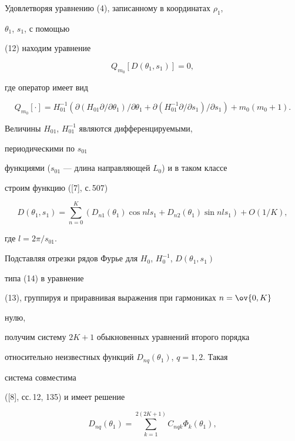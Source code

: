 Удовлетворяя уравнению (4), записанному в координатах $\rho_1$, 


$\theta_1$, $s_1$, с помощью  


(12) находим уравнение 


\begin{equation} 


Q_{m_0}[D(\theta_1,s_1)]=0, 


\end{equation} 


где оператор имеет вид 


$$ 


Q_{m_0}[\cdot]=H^{-1}_{01}(\partial(H_{01}\partial/ 


\partial\theta_1)/\partial\theta_1+\partial(H^{-1}_{01}\partial/ 


\partial s_1)/\partial s_1)+m_0(m_0+1). 


$$ 


Величины $H_{01}$, $H^{-1}_{01}$ являются дифференцируемыми, 


периодическими по $s_{01}$ 


функциями ($s_{01}$ --- длина направляющей $L_0$) и в таком классе 


строим функцию ([7], с.\,507) 


\begin{equation} 


D(\theta_1,s_1)=\sum^K_{n=0}(D_{n1}(\theta_1)\cos n l s_1+ 


D_{n2}(\theta_1)\sin n l s_1)+O(1/K), 


\end{equation} 


где $l=2\pi/s_{01}$. 


 


Подставляя отрезки рядов Фурье для $H_0$, $H^{-1}_0$, $D(\theta_1,s_1)$ 


типа (14) в уравнение 


(13), группируя и приравнивая выражения при гармониках $n=\ov{0,K}$ 


нулю,  


получим систему $2K+1$ обыкновенных уравнений второго порядка  


относительно неизвестных функций $D_{n q}(\theta_1)$, $q=1,2$. Такая 


система совместима 


([8], сс.\,12, 135) и имеет решение 


\begin{equation} 


D_{n q}(\theta_1)=\sum^{2(2K+1)}_{k=1}C_{n q k}\Phi_k(\theta_1), 


\end{equation} 


